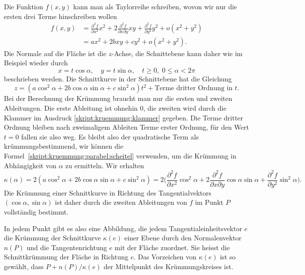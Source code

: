 Die Funktion $f(x,y)$ kann man als Taylorreihe schreiben, wovon wir nur
die ersten drei Terme hinschreiben wollen
\begin{align*}
f(x,y)
&=
\frac{\partial^2 f}{\partial x^2}x^2
+
2\frac{\partial^2 f}{\partial x\partial y}xy
+
\frac{\partial^2 f}{\partial y^2}y^2
+
o(x^2+y^2)
\\
&=
ax^2 + 2bxy + cy^2 + o(x^2+y^2).
\end{align*}
Die Normale auf die Fläche ist die $z$-Achse, die Schnittebene kann
daher wie im Beispiel wieder durch
\[
x=t\cos\alpha,\quad y=t\sin\alpha,\quad
t\ge 0,\; 0\le \alpha < 2\pi
\]
beschrieben werden.
Die Schnittkurve in der Schnittebene hat die Gleichung
\begin{equation}
z
=
(a\cos^2\alpha + 2b\cos\alpha\sin\alpha  + c\sin^2\alpha)t^2
+
\text{Terme dritter Ordnung in $t$}.
\label{skript:kruemmung:klammer}
\end{equation}
Bei der Berechnung der Krümmung braucht man nur die ersten und zweiten
Ableitungen. 
Die erste Ableitung ist ohnehin $0$, die zweiten wird durch die Klammer
im Ausdruck \eqref{skript:kruemmung:klammer} gegeben.
Die Terme dritter Ordnung bleiben nach zweimaligem Ableiten Terme erster
Ordnung, für den Wert $t=0$ fallen sie also weg.
Es bleibt also der quadratische Term als krümmungsbestimmend, wir
können die Formel~\eqref{skript:kruemmung:parabel:scheitel} verwenden, um die
Krümmung in Abhängigkeit von $\alpha$ zu ermitteln.
Wir erhalten
\begin{equation}
\kappa(\alpha)
=
2(a\cos^2\alpha + 2b\cos\alpha\sin\alpha + c\sin^2 \alpha)
=
2\biggl(
\frac{\partial^2 f}{\partial x^2}\cos^2\alpha
+
2\frac{\partial^2 f}{\partial x\partial y}\cos\alpha\sin\alpha
+
\frac{\partial^2 f}{\partial y^2}\sin^2 \alpha
\biggr).
\label{skript:kurve:kruemmungalpha}
\end{equation}
Die Krümmung einer Schnittkurve in Richtung des Tangentialvektors
$(\cos\alpha,\sin\alpha)$ ist daher durch die zweiten Ableitungen von
$f$ im Punkt $P$ vollständig bestimmt.

\begin{definition}
In jedem Punkt gibt es also eine Abbildung, die jedem
Tangentialeinheitsvektor $e$
die Krümmung der Schnittkurve $\kappa(e)$ einer Ebene durch den Normalenvektor
$n(P)$ und die Tangentenrichtung $e$ mit der Fläche zuordnet.
Sie heisst die Schnittkrümmung der Fläche in Richtung $e$.
%
Das Vorzeichen von $\kappa(e)$ ist so gewählt, dass $P+n(P)/\kappa(e)$ der
Mittelpunkt des Krümmungskreises ist.
\end{definition}

